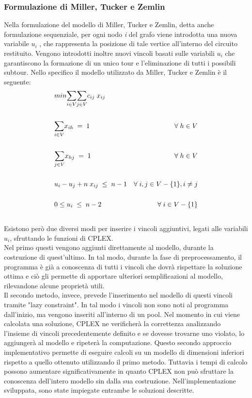 \subsubsection{Formulazione di Miller, Tucker e Zemlin}
Nella formulazione del modello di Miller, Tucker e Zemlin, detta anche formulazione sequenziale, per ogni nodo \textit{i} del grafo viene introdotta una nuova variabile $u_i$ , che rappresenta la posizione di tale vertice all'interno del circuito restituito. Vengono introdotti inoltre nuovi vincoli basati sulle variabili $u_i$ che garantiscono la formazione di un unico tour e l'eliminazione di tutti i possibili subtour. Nello specifico il modello utilizzato da Miller, Tucker e Zemlin è il seguente\cite{COMPACT_CITE}:
\begin{align}
& min \underset{i\in V}\sum{}\underset{j\in V}\sum{c_{ij}\; x_{ij}} \\ \notag \\
& \underset{i\in V}\sum{x_{ih}}\; =\; 1 & \forall\; h\in V \\ \notag \\
& \underset{j\in V}\sum{x_{hj}}\; =\; 1 & \forall\; h\in V \\ \notag \\
& u_i-u_j+n\; x_{ij}\;\leq\; n-1 & \forall\; i,j\in V-\{ 1\} , i\neq j \\ \notag \\
& 0\leq u_i\;\leq\; n-2 & \forall\; i\in V-\{ 1\} \\ \notag 
\end{align}
Esistono però due diversi modi per inserire i vincoli aggiuntivi, legati alle variabili $u_i$,  sfruttando le funzioni di CPLEX.\\
Nel primo questi vengono aggiunti direttamente al modello, durante la costruzione di quest'ultimo. In tal modo, durante la fase di preprocessamento, il programma è già a conoscenza di tutti i vincoli che dovrà rispettare la soluzione ottima e ciò gli permette di apportare ulteriori semplificazioni al modello, rilevandone alcune proprietà utili.\\
Il secondo metodo, invece, prevede l'inserimento nel modello di questi vincoli tramite "lazy constraint". In tal modo i vincoli non sono noti al programma dall'inizio, ma vengono inseriti all'interno di un pool. Nel momento in cui viene calcolata una soluzione, CPLEX ne verificherà la correttezza analizzando l'insieme di vincoli precedentemente definito e se dovesse trovarne uno violato, lo aggiungerà al modello e ripeterà la computazione.
 Questo secondo approccio implementativo permette di eseguire calcoli su un modello di dimensioni inferiori rispetto a quello ottenuto utilizzando il primo metodo. Tuttavia i tempi di calcolo possono aumentare significativamente in quanto CPLEX non può sfruttare la conoscenza dell'intero modello sin dalla sua costruzione. 
Nell'implementazione sviluppata, sono state impiegate entrambe le soluzioni descritte.

